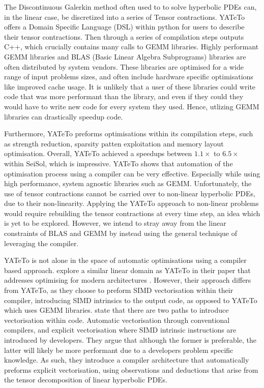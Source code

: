 The Discontinuous Galerkin method often used to to solve hyperbolic PDEs can, in the linear case, be discretized into a series of Tensor contractions.
YATeTo offers a Domain Specific Language (DSL) within python for users to describe their tensor contractions.
Then through a series of compilation steps outputs C++, which crucially contains many calls to GEMM libraries.
Highly performant GEMM libraries and BLAS (Basic Linear Algebra Subprograms) libraries are often distributed by system vendors.
These libraries are optimised for a wide range of input problems sizes, and often include hardware specific optimisations like improved cache usage.
It is unlikely that a user of these libraries could write code that was more performant than the library, and even if they could they would have to write new code for every system they used.
Hence, utlizing GEMM libraries can drastically speedup code.

Furthermore, YATeTo preforms optimisations within its compilation steps, such as strength reduction, sparsity patten exploitation and memory layout optimisation.
Overall, YATeTo achieved a speedups between $1.1\times$ to $6.5 \times$ within SeiSol, which is impressive.
YATeTo shows that automation of the optimisation process using a compiler can be very effective.
Especially while using high performance, system agnostic libraries such as GEMM.
Unfortunately, the use of tensor contractions cannot be carried over to non-linear hyperbolic PDEs, due to their non-linearity.
Applying the YATeTo approach to non-linear problems would require rebuilding the tensor contractions at every time step, an idea which is yet to be explored.
However, we intend to stray away from the linear constraints of BLAS and GEMM by instead using the general technique of leveraging the compiler.   





YATeTo is not alone in the space of automatic optimisations using a compiler based approach.
\citeauthor{codegen_dg_SIMD} explore a similar linear domain as YATeTo in their paper that addresses optimising for modern architectures \cite{codegen_dg_SIMD}. 
However, their approach differs from YATeTo, as they choose to preform SIMD vectorisation within their compiler, introducing SIMD intrinsics to the output code, as opposed to YATeTo which uses GEMM libraries.
\citeauthor{codegen_dg_SIMD} state that there are two paths to introduce vectorisation within code.
Automatic vectorisation through conventional compilers, and explicit vectorisation where SIMD intrinsic instructions are introduced by developers.
They argue that although the former is preferable, the latter will likely be more performant due to a developers problem specific knowledge.
As such, they introduce a compiler architecture that automatically preforms explicit vectorisation, using observations and deductions that arise from the tensor decomposition of linear hyperbolic PDEs.

